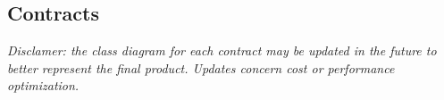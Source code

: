 \subsection{Contracts}
\textit{Disclamer: the class diagram for each contract may be updated in the future to better represent the final product. Updates concern cost or performance optimization.}



